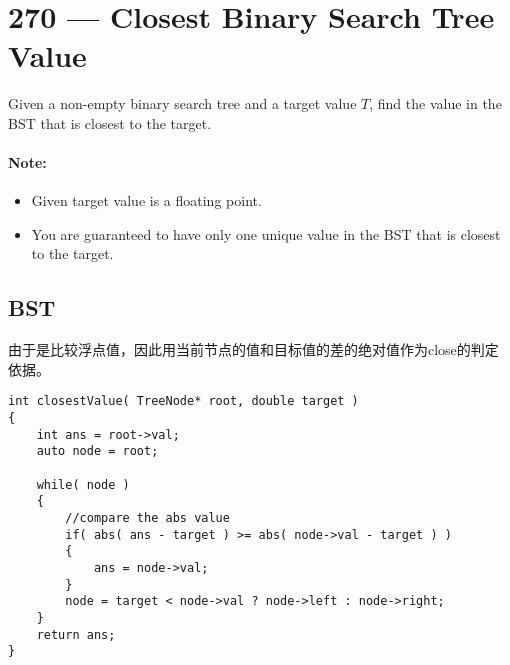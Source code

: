 \section{270 --- Closest Binary Search Tree Value}
Given a non-empty binary search tree and a target value $T$, find the value in the BST that is closest to the target.

\paragraph{Note:}

\begin{itemize}
\item Given target value is a floating point.
\item You are guaranteed to have only one unique value in the BST that is closest to the target.
\end{itemize}
\subsection{BST}
由于是比较浮点值，因此用当前节点的值和目标值的差的绝对值作为close的判定依据。
\setcounter{lstlisting}{0}
\begin{lstlisting}[style=customc,caption={BST}]
int closestValue( TreeNode* root, double target )
{
    int ans = root->val;
    auto node = root;

    while( node )
    {
        //compare the abs value
        if( abs( ans - target ) >= abs( node->val - target ) )
        {
            ans = node->val;
        }
        node = target < node->val ? node->left : node->right;
    }
    return ans;
}
\end{lstlisting}
